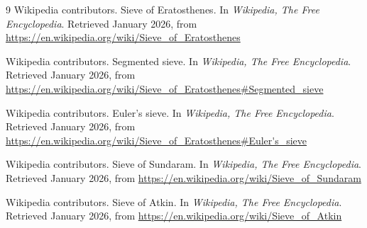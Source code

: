 \documentclass{article}
\begin{document}
\begin{thebibliography}{9}
    Wikipedia contributors. Sieve of Eratosthenes. In \textit{Wikipedia, The Free Encyclopedia}. Retrieved January 2026, from \url{https://en.wikipedia.org/wiki/Sieve_of_Eratosthenes}

    Wikipedia contributors. Segmented sieve. In \textit{Wikipedia, The Free Encyclopedia}. Retrieved January 2026, from \url{https://en.wikipedia.org/wiki/Sieve_of_Eratosthenes#Segmented_sieve}

    Wikipedia contributors. Euler's sieve. In \textit{Wikipedia, The Free Encyclopedia}. Retrieved January 2026, from \url{https://en.wikipedia.org/wiki/Sieve_of_Eratosthenes#Euler's_sieve}

    Wikipedia contributors. Sieve of Sundaram. In \textit{Wikipedia, The Free Encyclopedia}. Retrieved January 2026, from \url{https://en.wikipedia.org/wiki/Sieve_of_Sundaram}

    Wikipedia contributors. Sieve of Atkin. In \textit{Wikipedia, The Free Encyclopedia}. Retrieved January 2026, from \url{https://en.wikipedia.org/wiki/Sieve_of_Atkin}
\end{thebibliography}
\end{document}
